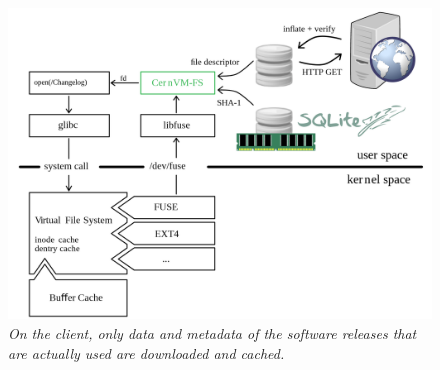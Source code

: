 \begin{figure}[h]
\centering
\includegraphics[scale=0.27]{figures/client_cvmfs}
\caption{\textit{On the client, only data and metadata of the software releases that are actually used are downloaded and cached.}}
\end{figure}

